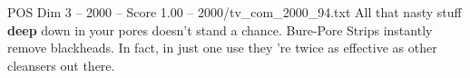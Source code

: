\begin{textsample}{POS Dim 3 – 2000 – Score 1.00 – 2000/tv\_com\_2000\_94.txt}  \label{ex:f3_pos_089}
All that nasty stuff \textbf{deep} down in your pores doesn't stand a chance.
Bure-Pore Strips instantly remove blackheads.
In fact, in just one use they 're twice as effective as other cleansers out there.

\end{textsample}
